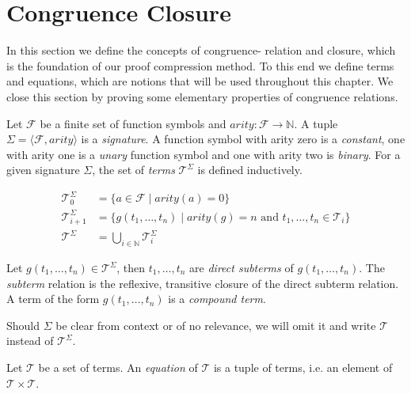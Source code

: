 \section{Congruence Closure}
\label{sec:congruencedef}

In this section we define the concepts of congruence- relation and closure, which is the foundation of our proof compression method.
To this end we define terms and equations, which are notions that will be used throughout this chapter.
We close this section by proving some elementary properties of congruence relations.

\begin{definition}

Let $\mathcal{F}$ be a finite set of function symbols and $arity: \mathcal{F} \rightarrow \mathbb{N}$.
A tuple $\Sigma = \langle \mathcal{F}, arity \rangle$ is a \emph{signature}.
A function symbol with arity zero is a \emph{constant}, one with arity one is a \emph{unary} function symbol and one with arity two is \emph{binary}.
For a given signature $\Sigma$, the set of \emph{terms} $\mathcal{T}^{\Sigma}$ is defined inductively.

\begin{align*}
	\mathcal{T}^{\Sigma}_0 &= \{a \in \mathcal{F} \mid arity(a) = 0\}\\
	\mathcal{T}^{\Sigma}_{i+1} &= \{g(t_1,\ldots,t_n) \mid arity(g) = n \text{ and } t_1, \ldots, t_n \in \mathcal{T}_{i}\} \\
	\mathcal{T}^{\Sigma} &= \bigcup_{i\in \mathbb{N}} \mathcal{T}^{\Sigma}_{i}
\end{align*}

\noindent Let $g(t_1,\ldots,t_n) \in \mathcal{T}^{\Sigma}$, then $t_1,\ldots,t_n$ are \emph{direct subterms} of $g(t_1,\ldots,t_n)$.
The \emph{subterm} relation is the reflexive, transitive closure of the direct subterm relation.
A term of the form $g(t_1,\ldots,t_n)$ is a \emph{compound term}.

\end{definition}

\noindent Should $\Sigma$ be clear from context or of no relevance, we will omit it and write $\mathcal{T}$ instead of $\mathcal{T}^{\Sigma}$.

\begin{definition}[Equation]

Let $\mathcal{T}$ be a set of terms.
An \emph{equation} of $\mathcal{T}$ is a tuple of terms, i.e. an element of $\mathcal{T} \times \mathcal{T}$.

\end{definition}

